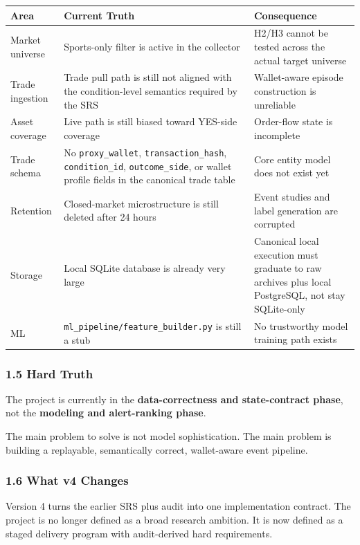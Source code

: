 \documentclass[
]{article}
\newcounter{none} %
\begin{document}
{\def\LTcaptype{none} %
\begin{longtable}[]{@{}lll@{}}
\toprule\noalign{}
Area & Current Truth & Consequence \\
\midrule\noalign{}
\endhead
\bottomrule\noalign{}
\endlastfoot
Market universe & Sports-only filter is active in the collector & H2/H3
cannot be tested across the actual target universe \\
Trade ingestion & Trade pull path is still not aligned with the
condition-level semantics required by the SRS & Wallet-aware episode
construction is unreliable \\
Asset coverage & Live path is still biased toward YES-side coverage &
Order-flow state is incomplete \\
Trade schema & No \texttt{proxy\_wallet}, \texttt{transaction\_hash},
\texttt{condition\_id}, \texttt{outcome\_side}, or wallet profile fields
in the canonical trade table & Core entity model does not exist yet \\
Retention & Closed-market microstructure is still deleted after 24 hours
& Event studies and label generation are corrupted \\
Storage & Local SQLite database is already very large & Canonical local
execution must graduate to raw archives plus local PostgreSQL, not stay
SQLite-only \\
ML & \texttt{ml\_pipeline/feature\_builder.py} is still a stub & No
trustworthy model training path exists \\
\end{longtable}
}

\subsubsection{1.5 Hard Truth}\label{15-hard-truth}

The project is currently in the \textbf{data-correctness and
state-contract phase}, not the \textbf{modeling and alert-ranking
phase}.

The main problem to solve is not model sophistication. The main problem
is building a replayable, semantically correct, wallet-aware event
pipeline.

\subsubsection{1.6 What v4 Changes}\label{16-what-v4-changes}

Version 4 turns the earlier SRS plus audit into one implementation
contract. The project is no longer defined as a broad research ambition.
It is now defined as a staged delivery program with audit-derived hard
requirements.
\end{document}
